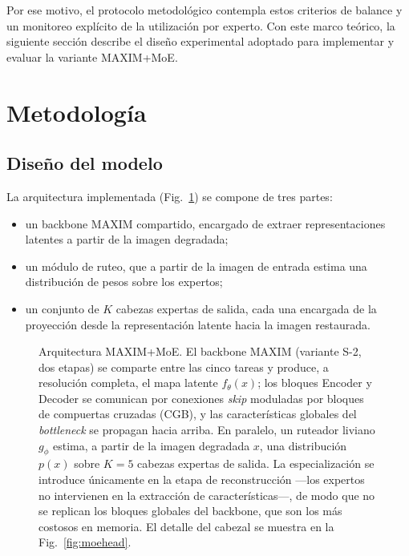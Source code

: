 \documentclass[aps,prl,twocolumn,groupedaddress]{revtex4-2}
\begin{document}
Por ese motivo, el protocolo metodológico contempla estos criterios de balance y un monitoreo explícito de la utilización por experto. Con este marco teórico, la siguiente sección describe el diseño experimental adoptado para implementar y evaluar la variante MAXIM+MoE.

\section{Metodología}

\subsection{Diseño del modelo}

La arquitectura implementada (Fig.~\ref{fig:arch}) se compone de tres partes:
\begin{itemize}
    \item un backbone MAXIM compartido, encargado de extraer representaciones latentes a partir de la imagen degradada;
    \item un módulo de ruteo, que a partir de la imagen de entrada estima una distribución de pesos sobre los expertos;
    \item un conjunto de $K$ cabezas expertas de salida, cada una encargada de la proyección desde la representación latente hacia la imagen restaurada.
\end{itemize}

\begin{figure}[t]
\centering

\caption{\label{fig:arch}Arquitectura MAXIM+MoE. El backbone MAXIM (variante S-2, dos
etapas) se comparte entre las cinco tareas y produce, a resolución completa, el mapa
latente $f_\theta(x)$; los bloques Encoder y Decoder se comunican por conexiones
\textit{skip} moduladas por bloques de compuertas cruzadas (CGB), y las características
globales del \textit{bottleneck} se propagan hacia arriba. En paralelo, un ruteador
liviano $g_\phi$ estima, a partir de la imagen degradada $x$, una distribución $p(x)$
sobre $K=5$ cabezas expertas de salida. La especialización se introduce únicamente en
la etapa de reconstrucción ---los expertos no intervienen en la extracción de
características---, de modo que no se replican los bloques globales del backbone, que
son los más costosos en memoria. El detalle del cabezal se muestra en la
Fig.~\ref{fig:moehead}.}
\end{figure}
\end{document}
